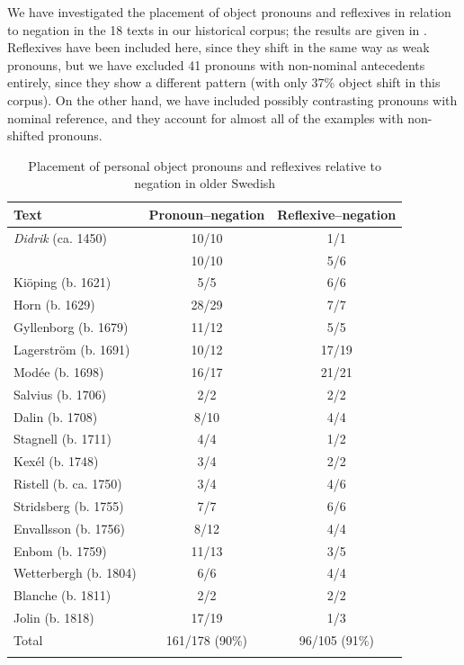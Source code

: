 \documentclass[output=paper]{langscibook}
\begin{document}
\z
\z


We have investigated the placement of object pronouns and reflexives in relation to negation in the 18 texts in our historical corpus; the results are given in . Reflexives have been included here, since they shift in the same way as weak pronouns, but we have excluded 41 pronouns with non-nominal antecedents entirely, since they show a different pattern (with only 37\% object shift in this corpus). On the other hand, we have included possibly contrasting pronouns with nominal reference, and they account for almost all of the examples with non-shifted pronouns.


\begin{table}
\caption{Placement of personal object pronouns and reflexives relative to negation in older Swedish}
\label{tab:lalu:4}
\begin{tabular}{lcc}
\lsptoprule
Text & Pronoun–negation & Reflexive--negation\\
\midrule
\textit{Didrik} (ca. 1450) & 10/10 & 1/1\\
\citet{Swart1560} & 10/10 & 5/6\\
Kiöping (b. 1621) & 5/5 & 6/6\\
Horn (b. 1629) & 28/29 & 7/7\\
Gyllenborg (b. 1679) & 11/12 & 5/5\\
Lagerström (b. 1691) & 10/12 & 17/19\\
Modée (b. 1698) & 16/17 & 21/21\\
Salvius (b. 1706) & 2/2 & 2/2\\
Dalin (b. 1708) & 8/10 & 4/4\\
Stagnell (b. 1711) & 4/4 & 1/2\\
Kexél (b. 1748) & 3/4 & 2/2\\
Ristell (b. ca. 1750) & 3/4 & 4/6\\
Stridsberg (b. 1755) & 7/7 & 6/6\\
Envallsson (b. 1756) & 8/12 & 4/4\\
Enbom (b. 1759) & 11/13 & 3/5\\
Wetterbergh (b. 1804) & 6/6 & 4/4\\
Blanche (b. 1811) & 2/2 & 2/2\\
Jolin (b. 1818) & 17/19 & 1/3\\
\midrule
Total & 161/178 (90\%) & 96/105 (91\%)\\
\lspbottomrule
\end{tabular}
\end{table}
\end{document}
